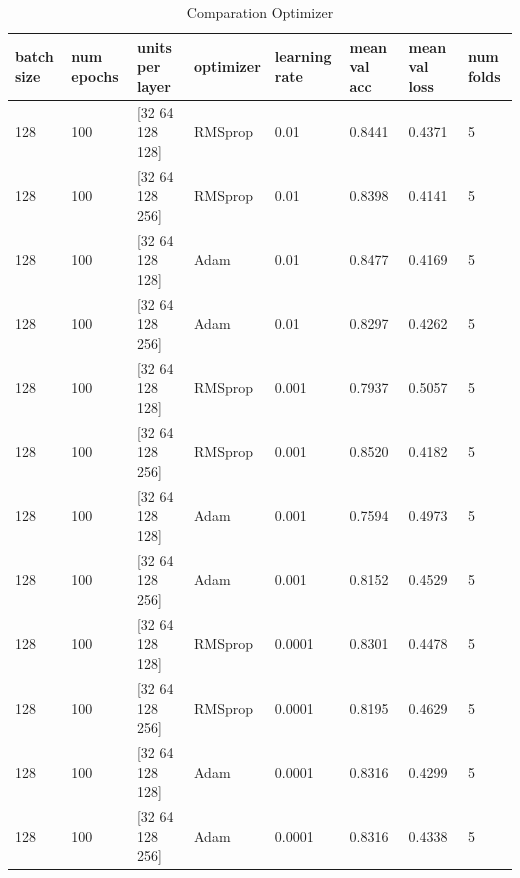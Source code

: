 \documentclass{book}
\begin{document}
            \begin{table}
                \begin{center}
                    \begin{tabular}{m{1cm}m{1cm}m{2.5cm}m{1.3cm}m{1cm}m{2cm}m{2cm}m{1cm}}
                        \midrule
                        batch size	& num epochs	& units per layer	& optimizer	& learning rate	& mean val acc	& mean val loss	& num folds \\
                        \midrule
                        128	& 100	& [32  64  128  128]	& RMSprop	& 0.01	& 0.8441 & 0.4371 & 5 \\
                        \midrule
                        128	& 100	& [32  64  128  256]	& RMSprop	& 0.01	& 0.8398 & 0.4141 & 5 \\
                        \midrule
                        128	& 100	& [32  64  128  128]	& Adam	& 0.01	& 0.8477 & 0.4169 & 5 \\
                        \midrule
                        128	& 100	& [32  64  128  256]	& Adam	& 0.01	& 0.8297 & 0.4262 & 5 \\
                        \midrule
                        128	& 100	& [32  64  128  128]	& RMSprop	& 0.001	& 0.7937 & 0.5057 & 5 \\
                        \midrule
                        128	& 100	& [32  64  128  256]	& RMSprop	& 0.001	& 0.8520 & 0.4182 & 5 \\
                        \midrule
                        128	& 100	& [32  64  128  128]	& Adam	& 0.001	& 0.7594 & 0.4973 & 5 \\
                        \midrule
                        128	& 100	& [32  64  128  256]	& Adam	& 0.001	& 0.8152 & 0.4529 & 5 \\
                        \midrule
                        128	& 100	& [32  64  128  128]	& RMSprop	& 0.0001	& 0.8301 & 0.4478 & 5 \\
                        \midrule
                        128	& 100	& [32  64  128  256]	& RMSprop	& 0.0001	& 0.8195 & 0.4629 & 5 \\
                        \midrule
                        128	& 100	& [32  64  128  128]	& Adam	& 0.0001	& 0.8316 & 0.4299 & 5 \\
                        \midrule
                        128	& 100	& [32  64  128  256]	& Adam	& 0.0001	& 0.8316 & 0.4338 & 5 \\
                        \midrule
                    \end{tabular}
                \end{center}
                \caption{\label{tab:optimizer}Comparation Optimizer}
            \end{table}
\end{document}
